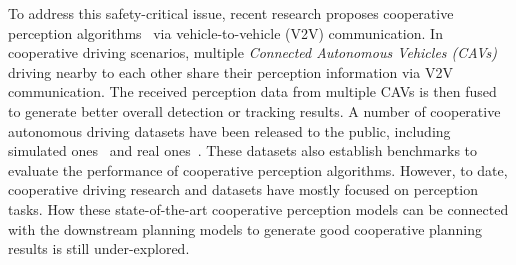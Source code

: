 To address this safety-critical issue, recent research proposes cooperative perception algorithms~\cite{chen2019fcooper, wang2020v2vnet, xu2022opencood, xu2022v2xvit, xu2022cobevt, chiu2024probabilistic} via vehicle-to-vehicle (V2V) communication. In cooperative driving scenarios, multiple \textit{Connected Autonomous Vehicles (CAVs)} driving nearby to each other share their perception information via V2V communication. The received perception data from multiple CAVs is then fused to generate better overall detection or tracking results.
A number of cooperative autonomous driving datasets have been released to the public, including simulated ones~\cite{xu2022opencood, li2022v2xsim, xu2022v2xvit, cui2022coopernaut} and real ones~\cite{xu2023v2v4real, xiang2024v2xreal, yu2022dair-v2x, zimmer2024tumtraf}. These datasets also establish benchmarks to evaluate the performance of cooperative perception algorithms. However, to date, cooperative driving research and datasets have mostly focused on perception tasks.
How these state-of-the-art cooperative perception models can be connected with the downstream planning models to generate good cooperative planning results is still under-explored. %



